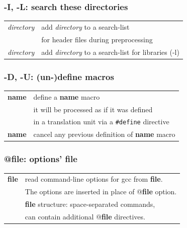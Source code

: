 \documentclass{beamer}
\begin{document}
\begin{frame}
\frametitle{-I, -L: search these directories}
\begin{table}
\begin{tabular}{l l}
\toprule
\texttt{\color{clFlag}{-I}}\textit{directory} &
    add \textit{directory} to a search-list \\[1ex]
    & for header files during preprocessing \\[2ex]
\texttt{\color{clFlag}{-L}}\textit{directory} &
    add \textit{directory} to a search-list for libraries (-l)\\ [3ex]
\bottomrule
\end{tabular}
\end{table}
\end{frame}


\begin{frame}
\frametitle{-D, -U: (un-)define macros}
\begin{table}
\begin{tabular}{l l}
\toprule
\texttt{\color{clFlag}{-D}}\textbf{name} &
    define a \textbf{name} macro\\[1ex]
    & it will be processed as if it was defined\\[1ex]
    & in a translation unit via a \texttt{\#define} directive\\[1ex]
\texttt{\color{clFlag}{-U}}\textbf{name} &
    cancel any previous definition of \textbf{name} macro\\[3ex]
\bottomrule
\end{tabular}
\end{table}
\end{frame}


\begin{frame}
\frametitle{@file: options' file}

\begin{table}
\begin{tabular}{l l}
\toprule
\texttt{\color{clFlag}{@}}\textbf{file} &
    read command-line options for gcc from \textbf{file}.\\[1ex]
    & The options are inserted in place of @\textbf{file} option.\\[1ex]
    & \textbf{file} structure: space-separated commands,\\[1ex]
    & can contain additional @\textbf{file} directives. \\[1ex]
\bottomrule
\end{tabular}
\end{table}
\end{frame}
\end{document}
